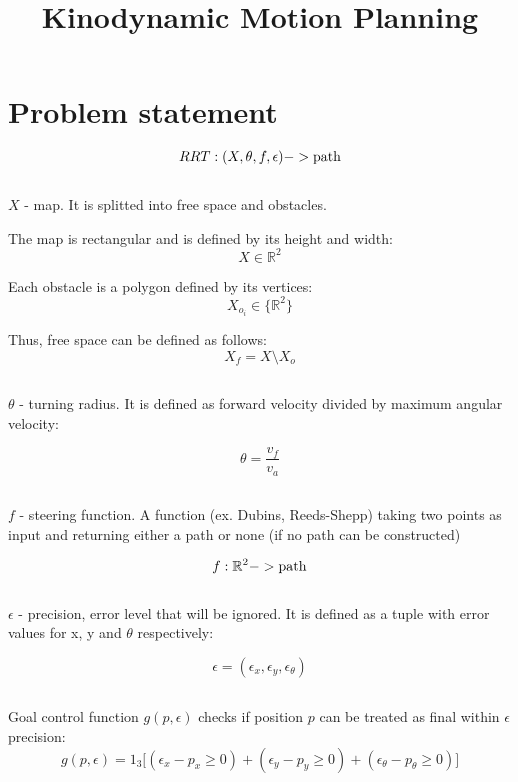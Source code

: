 \documentclass{article}
\title{Kinodynamic Motion Planning}
\author{}
\begin{document}
\maketitle

\section*{Problem statement}

$$
RRT: (X, \theta, f, \epsilon) -> \textnormal{path}
$$

\subsection*{}

$X$ - map. It is splitted into free space and obstacles.

The map is rectangular and is defined by its height and width:
$$
X \in \mathbb{R}^2
$$

Each obstacle is a polygon defined by its vertices:
$$
X_{o_i} \in \{\mathbb{R}^2\}
$$

Thus, free space can be defined as follows:
$$
X_f = X \setminus X_o
$$

\subsection*{}

$\theta$ - turning radius. It is defined as forward velocity divided by maximum angular velocity:

$$
\theta = \frac{v_f}{v_a}
$$

\subsection*{}

$f$ - steering function. A function (ex. Dubins, Reeds-Shepp) taking two points as input and returning either a path or none (if no path can be constructed)

$$
f: \mathbb{R}^2 -> \textnormal{path}
$$

\subsection*{}

$\epsilon$ - precision, error level that will be ignored. It is defined as a tuple with error values for x, y and $\theta$ respectively:

$$
\epsilon = (\epsilon_x, \epsilon_y, \epsilon_\theta)
$$

\subsection*{}

Goal control function $g(p, \epsilon)$ checks if position $p$ can be treated as final within $\epsilon$ precision:
$$g(p, \epsilon)=1_{3}\Big[(\epsilon_{x} - p_{x} \geq 0) + (\epsilon_{y} - p_{y} \geq 0) + (\epsilon_{\theta} - p_{\theta} \geq 0)\Big]$$
\end{document}

